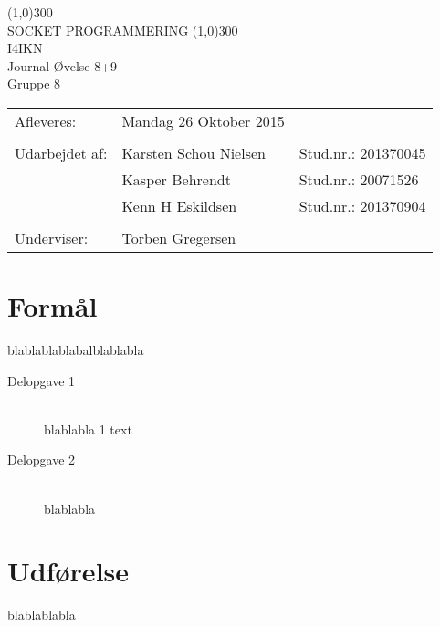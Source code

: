 \documentclass{article}
\begin{document}
\begin{titlepage}
\begin{center}
\line(1,0){300}\\
[0.25in]
\huge{SOCKET PROGRAMMERING} 											%
\line(1,0){300}\\
[1cm]
\huge{I4IKN\\ Journal Øvelse 8+9} \\
Gruppe 8\\ %
[3cm]

\large
\begin{tabular}{l l l}
Afleveres: 		& Mandag 26 Oktober 2015 & 						\\ 		%
																\\
Udarbejdet af:  & Karsten Schou Nielsen  & Stud.nr.: 201370045  \\
				& Kasper Behrendt		 & Stud.nr.: 20071526   \\
				& Kenn H Eskildsen 		 & Stud.nr.: 201370904  \\
																\\
Underviser:		& Torben Gregersen 								\\		%

\end{tabular}
\end{center}
\end{titlepage}


\section{Formål}

blablablablabalblablabla

\begin{description}
	\item[Delopgave 1] \hfill \\
		blablabla 1 text
	\item[Delopgave 2] \hfill \\
		blablabla
\end{description}

 

\section{Udførelse}

blablablabla



\end{document}

